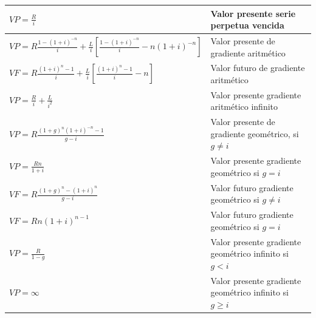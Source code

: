 \begin{spacing}{1}
\begin{center}
\begin{tabular}{ |p{7cm}|p{7cm}|}
$VP = \frac{R}{i}$ & Valor presente serie perpetua vencida\\ \hline 
$VP = R  \frac{1-(1 + i)^{-n}}{i} + \frac{L}{i}[ \frac{1-(1 + i)^{-n}}{i} - n(1 + i)^{-n} ]$ & Valor presente de gradiente aritmético\\ \hline 
 $VF = R  \frac{(1 + i)^{n} - 1}{i} + \frac{L}{i}[ \frac{(1 + i)^n - 1}{i} - n ]$ &  Valor futuro de gradiente aritmético\\ \hline 
$VP = \frac{R}{i} + \frac{L}{i^2}$ & Valor presente gradiente aritmético infinito\\ \hline 
$VP = R  \frac{(1 + g)^n  (1 + i)^{-n}-1}{g - i} $ & Valor presente de gradiente geométrico, si $g \neq i$\\ \hline 
$VP = \frac{Rn}{1 + i}$ & Valor presente gradiente geométrico si $g = i$\\ \hline 
$VF = R  \frac{(1 + g)^n - (1 + i)^n}{g - i} $ & Valor futuro gradiente geométrico si $g \neq i$\\ \hline 
$VF = Rn(1 + i)^{n-1} $ & Valor futuro gradiente geométrico si $g = i$\\ \hline 
$VP = \frac{R}{1 - g} $ & Valor presente gradiente geométrico infinito si $g < i$\\ \hline
 $VP = \infty $ & Valor presente gradiente geométrico infinito si $g \geq i$ &\\ \hline 
 
\end{tabular}


\end{center}
\end{spacing}

